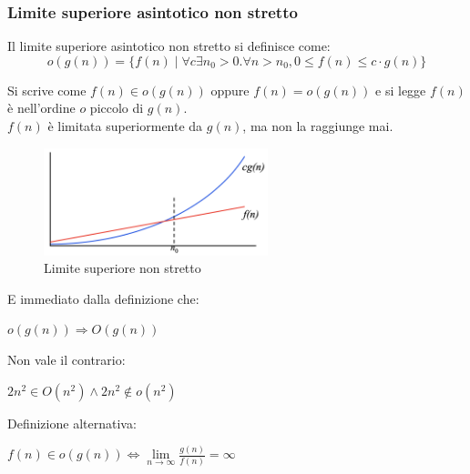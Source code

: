 \subsubsection{Limite superiore asintotico non stretto}
\begin{definition}
	Il limite superiore asintotico non stretto si definisce come:
	\begin{equation}
		o(g(n)) = \{f(n) \mid \forall c \exists n_0 > 0 . \forall n > n_0, 0 \leq f(n) \leq c \cdot g(n) \}
	\end{equation}
\end{definition}
\noindent Si scrive come $f(n) \in o(g(n))$ oppure $f(n) = o(g(n))$ e si legge $f(n)$ è nell'ordine $o$ piccolo di $g(n)$.\\
$f(n)$ è limitata superiormente da $g(n)$, ma non la raggiunge mai.\\
\begin{figure}
	\vspace{-15pt}
	\centering
	\includegraphics[width=6.5cm]{images/limite-superiore-asintotico-non-stretto.png}
	\vspace{-5pt}
	\caption{Limite superiore non stretto}
\end{figure}

\vspace{-15pt}
E immediato dalla definizione che:
\begin{center}
	$o(g(n)) \Longrightarrow O(g(n))$
\end{center}
Non vale il contrario: 
\begin{center}
	$2n^2 \in O(n^2) \land 2n^2 \notin o(n^2)$
\end{center}
Definizione alternativa:
\begin{center}
	$f(n) \in o(g(n)) \Longleftrightarrow \lim\limits_{n\to \infty}\frac{g(n)}{f(n)} = \infty$
\end{center}

